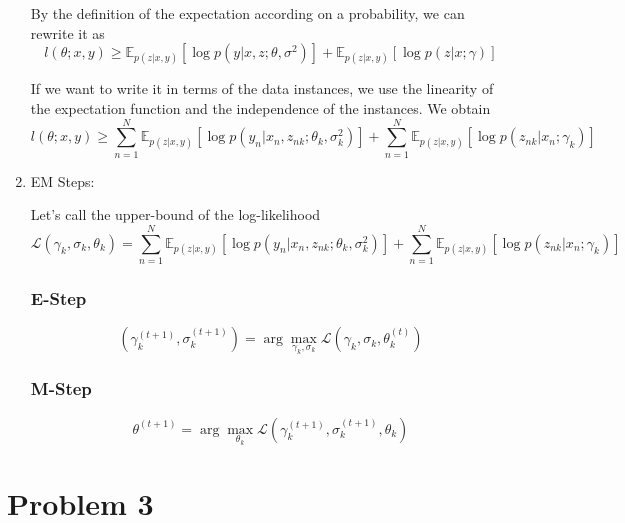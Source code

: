 \documentclass{article}
\begin{document}
\begin{enumerate}
By the definition of the expectation according on a probability, we can rewrite it as
\begin{equation*}
l(\theta;x,y) \ge \mathbb{E}_{p(z|x,y)}\left[\log p(y|x,z;\theta,\sigma^2)\right] + \mathbb{E}_{p(z|x,y)}\left[\log p(z|x;\gamma)\right]
\end{equation*}

If we want to write it in terms of the data instances, we use the linearity of the expectation function and the independence of the instances. We obtain
\begin{equation*}
l(\theta;x,y) \ge \sum_{n=1}^N\mathbb{E}_{p(z|x,y)}\left[\log p(y_n|x_n,z_{nk};\theta_k,\sigma_k^2)\right] + \sum_{n=1}^N\mathbb{E}_{p(z|x,y)}\left[\log p(z_{nk}|x_n;\gamma_k)\right]
\end{equation*}



\item EM Steps:

Let's call the upper-bound of the log-likelihood 
\begin{equation*}
\mathcal{L}(\gamma_k,\sigma_k,\theta_k) = \sum_{n=1}^N\mathbb{E}_{p(z|x,y)}\left[\log p(y_n|x_n,z_{nk};\theta_k,\sigma_k^2)\right] + \sum_{n=1}^N\mathbb{E}_{p(z|x,y)}\left[\log p(z_{nk}|x_n;\gamma_k)\right]
\end{equation*}

\subsubsection*{E-Step}
\begin{equation*}
\left(\gamma_k^{(t+1)},\sigma_k^{(t+1)}\right) = \arg\max_{\gamma_k,\sigma_k} \mathcal{L}(\gamma_k,\sigma_k,\theta_k^{(t)})
\end{equation*}
\subsubsection*{M-Step}
\begin{equation*}
\theta^{(t+1)} = \arg\max_{\theta_k} \mathcal{L}(\gamma_k^{(t+1)},\sigma_k^{(t+1)},\theta_k)
\end{equation*}


\end{enumerate}

\newpage

\section*{Problem 3}
\end{document}
